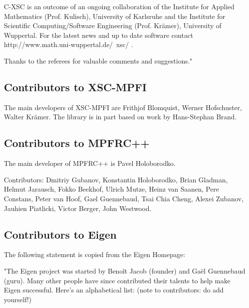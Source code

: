 \vpara
C-XSC is an outcome of an ongoing collaboration of the Institute for Applied Mathematics (Prof. Kulisch), University of Karlsruhe and the Institute for Scientific Computing/Software Engineering (Prof. Krämer), University of Wuppertal. For the latest news and up to date software contact http://www.math.uni-wuppertal.de/~xsc/ .

\vpara
Thanks to the referees for valuable comments and suggestions."



\subsection{Contributors to XSC-MPFI}
\label{Contributors to XSC-MPFI}
The main developers of XSC-MPFI are Frithjof Blomquist, Werner Hofschuster, Walter Kr\"amer. 
The library is in part based on work by Hans-Stephan Brand.



\subsection{Contributors to MPFRC++}
\label{Contributors to MPFRC++}
The main developer of MPFRC++ is Pavel Holoborodko.

Contributors:
Dmitriy Gubanov, Konstantin Holoborodko, Brian Gladman, 
Helmut Jarausch, Fokko Beekhof, Ulrich Mutze, Heinz van Saanen, 
Pere Constans, Peter van Hoof, Gael Guennebaud, Tsai Chia Cheng, 
Alexei Zubanov, Jauhien Piatlicki, Victor Berger, John Westwood.


%
%


\subsection{Contributors to Eigen}
\label{Contributors to Eigen}

The following statement is copied from the Eigen Homepage:

\vpara
"The Eigen project was started by Beno\^{i}t Jacob  (founder) and Ga\"{e}l Guennebaud (guru). Many other people have since contributed their talents to help make Eigen successful. Here's an alphabetical list: (note to contributors: do add yourself!) 

